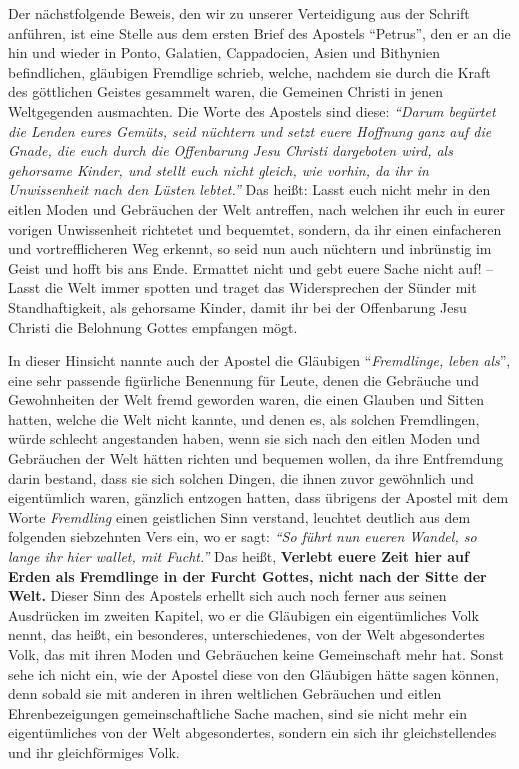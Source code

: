 Der nächstfolgende Beweis, den wir zu unserer Verteidigung aus der Schrift
anführen, ist eine Stelle aus dem ersten Brief des Apostels "`Petrus"', den er
an die hin und wieder in Ponto, Galatien, Cappadocien, Asien und
Bithynien befindlichen, gläubigen Fremdlige schrieb, welche, nachdem sie
durch die Kraft des göttlichen Geistes gesammelt waren, die Gemeinen Christi
in jenen Weltgegenden ausmachten. Die Worte des Apostels sind diese:
\textit{"`Darum
begürtet die Lenden eures Gemüts, seid nüchtern und setzt euere Hoffnung ganz
auf die Gnade, die euch durch die Offenbarung Jesu Christi dargeboten wird,
als gehorsame Kinder, und stellt euch nicht gleich, wie vorhin, da ihr in
Unwissenheit nach den Lüsten lebtet."'}
Das heißt:
Lasst euch nicht mehr in den eitlen Moden und Gebräuchen der Welt antreffen,
nach
welchen ihr euch in eurer vorigen Unwissenheit richtetet und bequemtet, sondern,
da ihr einen einfacheren und vortrefflicheren Weg erkennt, so seid nun auch
nüchtern und inbrünstig im Geist und hofft bis ans Ende. Ermattet nicht und
gebt euere Sache nicht auf! -- Lasst die Welt immer spotten und traget das
Widersprechen der Sünder mit Standhaftigkeit, als gehorsame Kinder, damit ihr
bei der Offenbarung Jesu Christi die Belohnung Gottes empfangen mögt.

\medskip


In dieser Hinsicht nannte auch der Apostel die Gläubigen "`\textit{Fremdlinge,
leben als}"', eine sehr
passende figürliche Benennung für Leute, denen die Gebräuche und Gewohnheiten
der Welt fremd geworden waren, die einen Glauben und Sitten hatten, welche die
Welt nicht kannte, und denen es, als solchen Fremdlingen, würde schlecht
angestanden haben, wenn sie sich nach den eitlen Moden und Gebräuchen der Welt
hätten richten und bequemen wollen, da ihre Entfremdung darin bestand, dass sie
sich solchen Dingen, die ihnen zuvor gewöhnlich und eigentümlich waren,
gänzlich entzogen hatten, dass übrigens der Apostel mit dem Worte
\textit{Fremdling}
einen geistlichen Sinn verstand, leuchtet deutlich aus dem folgenden siebzehnten
Vers ein, wo er sagt:
\textit{"`So führt nun eueren Wandel, so lange ihr hier wallet,
mit Fucht."'}
Das heißt, \textbf{Verlebt euere Zeit hier auf Erden als Fremdlinge in der
Furcht Gottes, nicht nach der Sitte der Welt.} Dieser Sinn des Apostels erhellt
sich
auch noch ferner aus seinen Ausdrücken im zweiten Kapitel, wo er die Gläubigen
ein eigentümliches Volk nennt, das heißt, ein besonderes, unterschiedenes, von
der
Welt abgesondertes Volk, das mit ihren Moden und Gebräuchen keine Gemeinschaft
mehr hat. Sonst sehe ich nicht ein, wie der Apostel diese von den Gläubigen
hätte sagen können, denn sobald sie mit anderen in ihren weltlichen Gebräuchen
und eitlen Ehrenbezeigungen gemeinschaftliche Sache machen, sind sie nicht mehr
ein eigentümliches von der Welt abgesondertes, sondern ein sich ihr
gleichstellendes und ihr gleichförmiges Volk.

